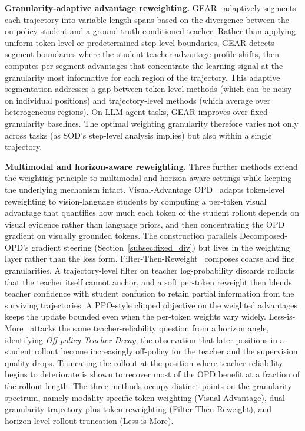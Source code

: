 \documentclass{article} %
\begin{document}
\textbf{Granularity-adaptive advantage reweighting.} GEAR~\citep{2605.11853} adaptively segments each trajectory into variable-length spans based on the divergence between the on-policy student and a ground-truth-conditioned teacher. Rather than applying uniform token-level or predetermined step-level boundaries, GEAR detects segment boundaries where the student-teacher advantage profile shifts, then computes per-segment advantages that concentrate the learning signal at the granularity most informative for each region of the trajectory. This adaptive segmentation addresses a gap between token-level methods (which can be noisy on individual positions) and trajectory-level methods (which average over heterogeneous regions). On LLM agent tasks, GEAR improves over fixed-granularity baselines. The optimal weighting granularity therefore varies not only across tasks (as SOD's step-level analysis implies) but also within a single trajectory.

\textbf{Multimodal and horizon-aware reweighting.} Three further methods extend the weighting principle to multimodal and horizon-aware settings while keeping the underlying mechanism intact. Visual-Advantage OPD~\citep{2605.21924} adapts token-level reweighting to vision-language students by computing a per-token visual advantage that quantifies how much each token of the student rollout depends on visual evidence rather than language priors, and then concentrating the OPD gradient on visually grounded tokens. The construction parallels Decomposed-OPD's gradient steering (Section~\ref{subsec:fixed_div}) but lives in the weighting layer rather than the loss form. Filter-Then-Reweight~\citep{2606.02684} composes coarse and fine granularities. A trajectory-level filter on teacher log-probability discards rollouts that the teacher itself cannot anchor, and a soft per-token reweight then blends teacher confidence with student confusion to retain partial information from the surviving trajectories. A PPO-style clipped objective on the weighted advantages keeps the update bounded even when the per-token weights vary widely. Less-is-More~\citep{2605.27028} attacks the same teacher-reliability question from a horizon angle, identifying \emph{Off-policy Teacher Decay}, the observation that later positions in a student rollout become increasingly off-policy for the teacher and the supervision quality drops. Truncating the rollout at the position where teacher reliability begins to deteriorate is shown to recover most of the OPD benefit at a fraction of the rollout length. The three methods occupy distinct points on the granularity spectrum, namely modality-specific token weighting (Visual-Advantage), dual-granularity trajectory-plus-token reweighting (Filter-Then-Reweight), and horizon-level rollout truncation (Less-is-More).
\end{document}
